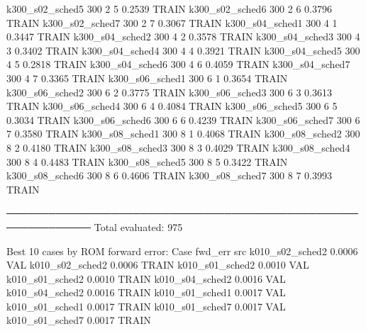   k300_s02_sched5                  300    2   5    0.2539  TRAIN
  k300_s02_sched6                  300    2   6    0.3796  TRAIN
  k300_s02_sched7                  300    2   7    0.3067  TRAIN
  k300_s04_sched1                  300    4   1    0.3447  TRAIN
  k300_s04_sched2                  300    4   2    0.3578  TRAIN
  k300_s04_sched3                  300    4   3    0.3402  TRAIN
  k300_s04_sched4                  300    4   4    0.3921  TRAIN
  k300_s04_sched5                  300    4   5    0.2818  TRAIN
  k300_s04_sched6                  300    4   6    0.4059  TRAIN
  k300_s04_sched7                  300    4   7    0.3365  TRAIN
  k300_s06_sched1                  300    6   1    0.3654  TRAIN
  k300_s06_sched2                  300    6   2    0.3775  TRAIN
  k300_s06_sched3                  300    6   3    0.3613  TRAIN
  k300_s06_sched4                  300    6   4    0.4084  TRAIN
  k300_s06_sched5                  300    6   5    0.3034  TRAIN
  k300_s06_sched6                  300    6   6    0.4239  TRAIN
  k300_s06_sched7                  300    6   7    0.3580  TRAIN
  k300_s08_sched1                  300    8   1    0.4068  TRAIN
  k300_s08_sched2                  300    8   2    0.4180  TRAIN
  k300_s08_sched3                  300    8   3    0.4029  TRAIN
  k300_s08_sched4                  300    8   4    0.4483  TRAIN
  k300_s08_sched5                  300    8   5    0.3422  TRAIN
  k300_s08_sched6                  300    8   6    0.4606  TRAIN
  k300_s08_sched7                  300    8   7    0.3993  TRAIN

──────────────────────────────────────────────────────────────
Total evaluated: 975

Best 10 cases by ROM forward error:
Case                               fwd_err  src
  k010_s02_sched2                   0.0006  VAL
  k010_s02_sched2                   0.0006  TRAIN
  k010_s01_sched2                   0.0010  VAL
  k010_s01_sched2                   0.0010  TRAIN
  k010_s04_sched2                   0.0016  VAL
  k010_s04_sched2                   0.0016  TRAIN
  k010_s01_sched1                   0.0017  VAL
  k010_s01_sched1                   0.0017  TRAIN
  k010_s01_sched7                   0.0017  VAL
  k010_s01_sched7                   0.0017  TRAIN
